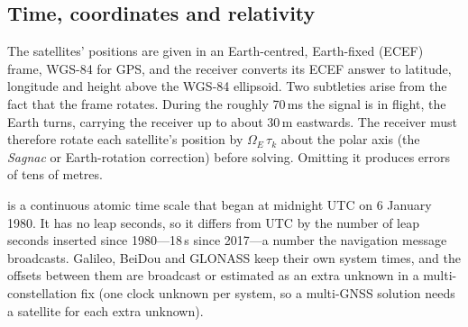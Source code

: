 
\subsection{Time, coordinates and relativity}

The satellites' positions are given in an Earth-centred, Earth-fixed (ECEF) frame, WGS-84 for
GPS, and the receiver converts its ECEF answer to latitude, longitude and height above the
WGS-84 ellipsoid. Two subtleties arise from the fact that the frame rotates. During the
roughly 70\,ms the signal is in flight, the Earth turns, carrying the receiver up to about
30\,m eastwards. The receiver must therefore rotate each satellite's position by
$\Omega_E\,\tau_k$ about the polar axis (the \emph{Sagnac} or Earth-rotation correction)
before solving. Omitting it produces errors of tens of metres.

 is a continuous atomic time scale that began at midnight UTC on 6 January
1980. It has no leap seconds, so it differs from UTC by the number of leap seconds inserted
since 1980---18\,s since 2017---a number the navigation message broadcasts. Galileo, BeiDou
and GLONASS keep their own system times, and the offsets between them are broadcast or
estimated as an extra unknown in a multi-constellation fix (one clock unknown per system,
so a multi-GNSS solution needs a satellite for each extra unknown).


